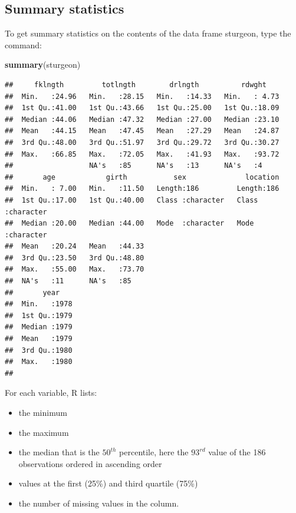 \documentclass[
  12pt,
]{book}
\newenvironment{Shaded}{\begin{snugshade}}{\end{snugshade}}
\newcommand{\KeywordTok}[1]{\textcolor[rgb]{0.13,0.29,0.53}{\textbf{#1}}}
\newcommand{\NormalTok}[1]{#1}
\providecommand{\tightlist}{%
  \setlength{\itemsep}{0pt}\setlength{\parskip}{0pt}}
\begin{document}
\hypertarget{summary-statistics}{%
\subsection{Summary statistics}\label{summary-statistics}}

To get summary statistics on the contents of the data frame sturgeon, type the command:

\begin{Shaded}
\begin{Highlighting}[]
\KeywordTok{summary}\NormalTok{(sturgeon)}
\end{Highlighting}
\end{Shaded}

\begin{verbatim}
##     fklngth         totlngth        drlngth          rdwght     
##  Min.   :24.96   Min.   :28.15   Min.   :14.33   Min.   : 4.73  
##  1st Qu.:41.00   1st Qu.:43.66   1st Qu.:25.00   1st Qu.:18.09  
##  Median :44.06   Median :47.32   Median :27.00   Median :23.10  
##  Mean   :44.15   Mean   :47.45   Mean   :27.29   Mean   :24.87  
##  3rd Qu.:48.00   3rd Qu.:51.97   3rd Qu.:29.72   3rd Qu.:30.27  
##  Max.   :66.85   Max.   :72.05   Max.   :41.93   Max.   :93.72  
##                  NA's   :85      NA's   :13      NA's   :4      
##       age            girth           sex              location        
##  Min.   : 7.00   Min.   :11.50   Length:186         Length:186        
##  1st Qu.:17.00   1st Qu.:40.00   Class :character   Class :character  
##  Median :20.00   Median :44.00   Mode  :character   Mode  :character  
##  Mean   :20.24   Mean   :44.33                                        
##  3rd Qu.:23.50   3rd Qu.:48.80                                        
##  Max.   :55.00   Max.   :73.70                                        
##  NA's   :11      NA's   :85                                           
##       year     
##  Min.   :1978  
##  1st Qu.:1979  
##  Median :1979  
##  Mean   :1979  
##  3rd Qu.:1980  
##  Max.   :1980  
## 
\end{verbatim}

For each variable, R lists:

\begin{itemize}
\tightlist
\item
  the minimum
\item
  the maximum
\item
  the median that is the \(50^{th}\) percentile, here the \(93^{rd}\) value of the 186 observations ordered in ascending order
\item
  values at the first (25\%) and third quartile (75\%)
\item
  the number of missing values in the column.
\end{itemize}
\end{document}
